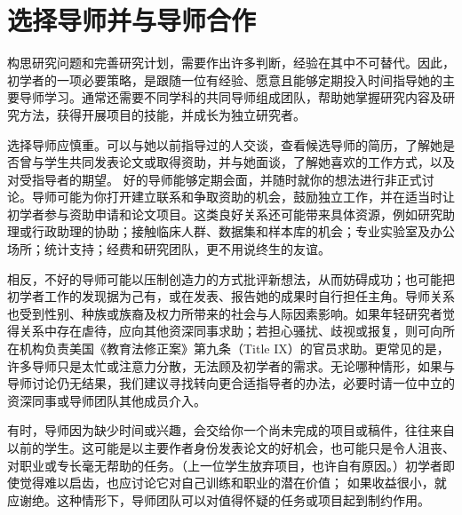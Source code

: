 \section{选择导师并与导师合作}
构思研究问题和完善研究计划，需要作出许多判断，经验在其中不可替代。因此，初学者的一项必要策略，是跟随一位有经验、愿意且能够定期投入时间指导她的主要导师学习。通常还需要不同学科的共同导师组成团队，帮助她掌握研究内容及研究方法，获得开展项目的技能，并成长为独立研究者。

选择导师应慎重。可以与她以前指导过的人交谈，查看候选导师的简历，了解她是否曾与学生共同发表论文或取得资助，并与她面谈，了解她喜欢的工作方式，以及对受指导者的期望。
好的导师能够定期会面，并随时就你的想法进行非正式讨论。导师可能为你打开建立联系和争取资助的机会，鼓励独立工作，并在适当时让初学者参与资助申请和论文项目。这类良好关系还可能带来具体资源，例如研究助理或行政助理的协助；接触临床人群、数据集和样本库的机会；专业实验室及办公场所；统计支持；经费和研究团队，更不用说终生的友谊。

相反，不好的导师可能以压制创造力的方式批评新想法，从而妨碍成功；也可能把初学者工作的发现据为己有，或在发表、报告她的成果时自行担任主角。导师关系也受到性别、种族或族裔及权力所带来的社会与人际因素影响。如果年轻研究者觉得关系中存在虐待，应向其他资深同事求助；若担心骚扰、歧视或报复，则可向所在机构负责美国《教育法修正案》第九条（Title IX）的官员求助。更常见的是，许多导师只是太忙或注意力分散，无法顾及初学者的需求。无论哪种情形，如果与导师讨论仍无结果，我们建议寻找转向更合适指导者的办法，必要时请一位中立的资深同事或导师团队其他成员介入。

有时，导师因为缺少时间或兴趣，会交给你一个尚未完成的项目或稿件，往往来自以前的学生。这可能是以主要作者身份发表论文的好机会，也可能只是令人沮丧、对职业或专长毫无帮助的任务。（上一位学生放弃项目，也许自有原因。）初学者即使觉得难以启齿，也应讨论它对自己训练和职业的潜在价值；
如果收益很小，就应谢绝。这种情形下，导师团队可以对值得怀疑的任务或项目起到制约作用。

